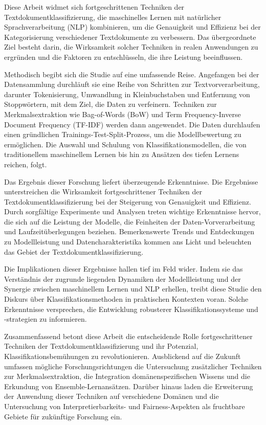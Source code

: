 Diese Arbeit widmet sich fortgeschrittenen Techniken der Textdokumentklassifizierung, die maschinelles Lernen mit natürlicher Sprachverarbeitung (NLP) kombinieren, um die Genauigkeit und Effizienz bei der Kategorisierung verschiedener Textdokumente zu verbessern. Das übergeordnete Ziel besteht darin, die Wirksamkeit solcher Techniken in realen Anwendungen zu ergründen und die Faktoren zu entschlüsseln, die ihre Leistung beeinflussen.

Methodisch begibt sich die Studie auf eine umfassende Reise. Angefangen bei der Datensammlung durchläuft sie eine Reihe von Schritten zur Textvorverarbeitung, darunter Tokenisierung, Umwandlung in Kleinbuchstaben und Entfernung von Stoppwörtern, mit dem Ziel, die Daten zu verfeinern. Techniken zur Merkmalsextraktion wie Bag-of-Words (BoW) und Term Frequency-Inverse Document Frequency (TF-IDF) werden dann angewendet. Die Daten durchlaufen einen gründlichen Trainings-Test-Split-Prozess, um die Modellbewertung zu ermöglichen. Die Auswahl und Schulung von Klassifikationsmodellen, die von traditionellem maschinellem Lernen bis hin zu Ansätzen des tiefen Lernens reichen, folgt.

Das Ergebnis dieser Forschung liefert überzeugende Erkenntnisse. Die Ergebnisse unterstreichen die Wirksamkeit fortgeschrittener Techniken der Textdokumentklassifizierung bei der Steigerung von Genauigkeit und Effizienz. Durch sorgfältige Experimente und Analysen treten wichtige Erkenntnisse hervor, die sich auf die Leistung der Modelle, die Feinheiten der Daten-Vorverarbeitung und Laufzeitüberlegungen beziehen. Bemerkenswerte Trends und Entdeckungen zu Modellleistung und Datencharakteristika kommen ans Licht und beleuchten das Gebiet der Textdokumentklassifizierung.

Die Implikationen dieser Ergebnisse hallen tief im Feld wider. Indem sie das Verständnis der zugrunde liegenden Dynamiken der Modellleistung und der Synergie zwischen maschinellem Lernen und NLP erhellen, treibt diese Studie den Diskurs über Klassifikationsmethoden in praktischen Kontexten voran. Solche Erkenntnisse versprechen, die Entwicklung robusterer Klassifikationssysteme und -strategien zu informieren.

Zusammenfassend betont diese Arbeit die entscheidende Rolle fortgeschrittener Techniken der Textdokumentklassifizierung und ihr Potenzial, Klassifikationsbemühungen zu revolutionieren. Ausblickend auf die Zukunft umfassen mögliche Forschungsrichtungen die Untersuchung zusätzlicher Techniken zur Merkmalsextraktion, die Integration domänenspezifischen Wissens und die Erkundung von Ensemble-Lernansätzen. Darüber hinaus laden die Erweiterung der Anwendung dieser Techniken auf verschiedene Domänen und die Untersuchung von Interpretierbarkeits- und Fairness-Aspekten als fruchtbare Gebiete für zukünftige Forschung ein.

